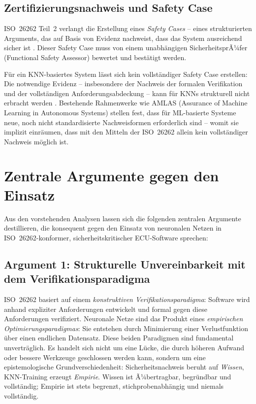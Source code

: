 ﻿\documentclass[12pt,a4paper]{article}
\begin{document}
\subsection{Zertifizierungsnachweis und Safety Case}
\label{subsec:safety_case}

ISO~26262 Teil~2 verlangt die Erstellung eines \emph{Safety Cases} -- eines
strukturierten Arguments, das auf Basis von Evidenz nachweist, dass das System
ausreichend sicher ist \cite{iso26262_2}. Dieser Safety Case muss von einem
unabh\"angigen SicherheitsprÃ¼fer (Functional Safety Assessor) bewertet und
best\"atigt werden.

F\"ur ein KNN-basiertes System l\"asst sich kein vollst\"andiger Safety Case
erstellen: Die notwendige Evidenz -- insbesondere der Nachweis der formalen
Verifikation und der vollst\"andigen Anforderungsabdeckung -- kann f\"ur KNNs
strukturell nicht erbracht werden \cite{AMLAS2021}. Bestehende Rahmenwerke wie
AMLAS (Assurance of Machine Learning in Autonomous Systems) \cite{AMLAS2021}
stellen fest, dass f\"ur ML-basierte Systeme neue, noch nicht standardisierte
Nachweisformen erforderlich sind -- womit sie implizit einr\"aumen, dass mit den
Mitteln der ISO~26262 allein kein vollst\"andiger Nachweis m\"oglich ist.

\section{Zentrale Argumente gegen den Einsatz}
\label{sec:argumente}

Aus den vorstehenden Analysen lassen sich die folgenden zentralen Argumente
destillieren, die konsequent gegen den Einsatz von neuronalen Netzen in
ISO~26262-konformer, sicherheitskritischer ECU-Software sprechen:

\subsection{Argument 1: Strukturelle Unvereinbarkeit mit dem Verifikationsparadigma}
\label{subsec:arg1}

ISO~26262 basiert auf einem \emph{konstruktiven Verifikationsparadigma}: Software
wird anhand expliziter Anforderungen entwickelt und formal gegen diese Anforderungen
verifiziert. Neuronale Netze sind das Produkt eines \emph{empirischen Optimierungsparadigmas}:
Sie entstehen durch Minimierung einer Verlustfunktion \"uber einen endlichen Datensatz.
Diese beiden Paradigmen sind fundamental unvertr\"aglich. Es handelt sich nicht um eine
L\"ucke, die durch h\"oheren Aufwand oder bessere Werkzeuge geschlossen werden kann,
sondern um eine epistemologische Grundverschiedenheit: Sicherheitsnachweis beruht
auf \emph{Wissen}, KNN-Training erzeugt \emph{Empirie}. Wissen ist Ã¼bertragbar,
begr\"undbar und vollst\"andig; Empirie ist stets begrenzt, stichprobenabh\"angig
und niemals vollst\"andig.
\end{document}
